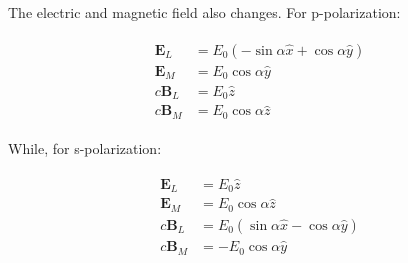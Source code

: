 \documentclass[12pt]{article}
\begin{document}
The electric and magnetic field also changes. For p-polarization:

\begin{align}
    \label{eq:field-p}
    \begin{split}
        \mathbf{E}_L  & = E_0(-\sin\alpha \hat{x} + \cos\alpha \hat{y}) \\
        \mathbf{E}_M  & = E_0\cos\alpha \hat{y}                         \\
        c\mathbf{B}_L & = E_0\hat{z}                                    \\
        c\mathbf{B}_M & = E_0\cos\alpha \hat{z}
    \end{split}
\end{align}

While, for s-polarization:

\begin{align}
    \label{eq:field-s}
    \begin{split}
        \mathbf{E}_L & = E_0\hat{z}                                    \\
        \mathbf{E}_M & = E_0\cos\alpha \hat{z}                        \\
        c\mathbf{B}_L & = E_0(\sin\alpha \hat{x} - \cos\alpha \hat{y}) \\
        c\mathbf{B}_M & = -E_0\cos\alpha \hat{y}
    \end{split}
\end{align}
\end{document}
